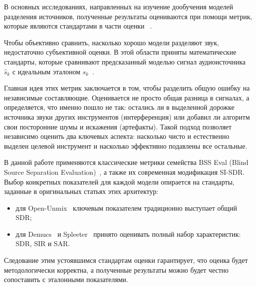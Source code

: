\documentclass[14pt]{extarticle}
\begin{document}
В основных исследованиях, направленных на изучение дообучения моделей разделения источников, полученные результаты 
оцениваются при помощи метрик, которые являются стандартами в части оценки ~\cite{metrics}.



Чтобы объективно сравнить, насколько хорошо модели разделяют звук, недостаточно субъективной оценки.
В этой области приняты математические стандарты, которые сравнивают предсказанный моделью сигнал аудиоисточника $\hat{s}_k$ 
с идеальным эталоном $s_k$~\cite{metrics}. 

Главная идея этих метрик заключается в том, чтобы разделить общую ошибку на независимые составляющие. 
Оценивается не просто общая разница в сигналах, а определяется, что именно пошло не так: остались ли в выделенной дорожке источника
звуки других инструментов (интерференция) или добавил ли алгоритм свои посторонние шумы и искажения (артефакты). 
Такой подход позволяет независимо оценить два ключевых аспекта: насколько чисто и естественно выделен целевой инструмент и насколько эффективно 
подавлены все остальные.

В данной работе применяются классические метрики семейства BSS Eval (Blind Source Separation Evaluation)~\cite{metrics}, 
а также их современная модификация SI-SDR. Выбор конкретных показателей для каждой модели опирается на стандарты, 
заданные в оригинальных статьях этих архитектур:
\begin{itemize}
    \item для Open-Unmix~\cite{openunmix} ключевым показателем традиционно выступает общий SDR;
    \item для Demucs~\cite{demucs} и Spleeter~\cite{Spleeter} принято оценивать полный набор характеристик: SDR, SIR и SAR.
\end{itemize}
Следование этим устоявшимся стандартам оценки гарантирует, что оценка будет методологически корректна, 
а полученные результаты можно будет честно сопоставить с эталонными показателями.
\end{document}

